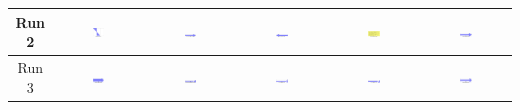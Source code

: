 \begin{table}[H]
\begin{tabular}{|c|c|c|c|c|c|}
    \hline
    Run 2 & \includegraphics[width=0.15\textwidth]{./run_2/png/gpt-4o_results/Arrow.png} & \includegraphics[width=0.15\textwidth]{./run_2/png/claude-3-5-sonnet-20240620_results/Arrow.png} & \includegraphics[width=0.15\textwidth]{./run_2/png/watsonx_meta-llama_llama-3-1-70b-instruct_results/Arrow.png} & \includegraphics[width=0.15\textwidth]{./run_2/png/watsonx_meta-llama_llama-3-405b-instruct_results/Arrow.png} & \includegraphics[width=0.15\textwidth]{./run_2/png/o1-preview_results/Arrow.png} \\
    \hline
    Run 3 & \includegraphics[width=0.15\textwidth]{./run_3/png/gpt-4o_results/Arrow.png} & \includegraphics[width=0.15\textwidth]{./run_3/png/claude-3-5-sonnet-20240620_results/Arrow.png} & \includegraphics[width=0.15\textwidth]{./run_3/png/watsonx_meta-llama_llama-3-1-70b-instruct_results/Arrow.png} & \includegraphics[width=0.15\textwidth]{./run_3/png/watsonx_meta-llama_llama-3-405b-instruct_results/Arrow.png} & \includegraphics[width=0.15\textwidth]{./run_3/png/o1-preview_results/Arrow.png} \\
    \hline

\end{tabular}
\end{table}
